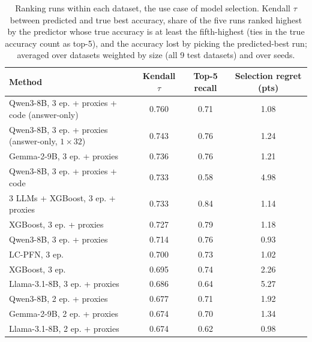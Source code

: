 \begin{table}[t]
\centering
\footnotesize
\caption{Ranking runs within each dataset, the use case of model selection. Kendall $\tau$ between predicted and true best accuracy, share of the five runs ranked highest by the predictor whose true accuracy is at least the fifth-highest (ties in the true accuracy count as top-5), and the accuracy lost by picking the predicted-best run; averaged over datasets weighted by size (all 9 test datasets) and over seeds.}
\label{tab:ranking}
\begin{tabular}{lccc}
\toprule
Method & Kendall $\tau$ & Top-5 recall & Selection regret (pts) \\
\midrule
Qwen3-8B, 3 ep. + proxies + code (answer-only) & 0.760 & 0.71 & 1.08 \\
Qwen3-8B, 3 ep. + proxies (answer-only, $1\times32$) & 0.743 & 0.76 & 1.24 \\
Gemma-2-9B, 3 ep. + proxies & 0.736 & 0.76 & 1.21 \\
Qwen3-8B, 3 ep. + proxies + code & 0.733 & 0.58 & 4.98 \\
3 LLMs + XGBoost, 3 ep. + proxies & 0.733 & 0.84 & 1.14 \\
XGBoost, 3 ep. + proxies & 0.727 & 0.79 & 1.18 \\
Qwen3-8B, 3 ep. + proxies & 0.714 & 0.76 & 0.93 \\
LC-PFN, 3 ep. & 0.700 & 0.73 & 1.02 \\
XGBoost, 3 ep. & 0.695 & 0.74 & 2.26 \\
Llama-3.1-8B, 3 ep. + proxies & 0.686 & 0.64 & 5.27 \\
Qwen3-8B, 2 ep. + proxies & 0.677 & 0.71 & 1.92 \\
Gemma-2-9B, 2 ep. + proxies & 0.674 & 0.70 & 1.34 \\
Llama-3.1-8B, 2 ep. + proxies & 0.674 & 0.62 & 0.98 \\
\bottomrule
\end{tabular}
\end{table}
